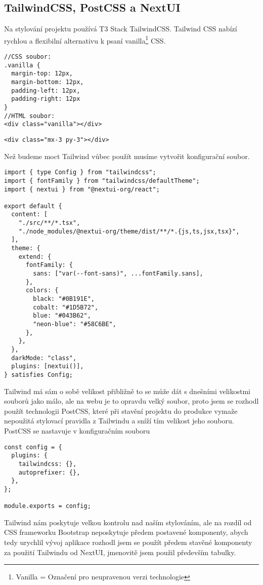 \subsection{TailwindCSS, PostCSS a NextUI}
Na stylování projektu používá T3 Stack TailwindCSS. Tailwind CSS nabízí rychlou a flexibilní alternativu k psaní vanilla\footnote{Vanilla = Označení pro neupravenou verzi technologie} CSS.
\begin{lstlisting}[caption={Ukázka stylování HTML prvku za použití vanilla CSS\cite{tailwind-example}}]
//CSS soubor:
.vanilla {
  margin-top: 12px,
  margin-bottom: 12px,
  padding-left: 12px,
  padding-right: 12px
}
//HTML soubor:
<div class="vanilla"></div>
\end{lstlisting}
\begin{lstlisting}[caption={Ukázka stylování HTML prvku za použití TailwindCSS\cite{tailwind-example}}]
    <div class="mx-3 py-3"></div>
\end{lstlisting}
Než budeme moct Tailwind vůbec použít musíme vytvořit konfigurační soubor\newline{}.

\begin{lstlisting}[caption={Konfigurační soubor TailwindCSS}]
import { type Config } from "tailwindcss";
import { fontFamily } from "tailwindcss/defaultTheme";
import { nextui } from "@nextui-org/react";

export default {
  content: [
    "./src/**/*.tsx",
    "./node_modules/@nextui-org/theme/dist/**/*.{js,ts,jsx,tsx}",
  ],
  theme: {
    extend: {
      fontFamily: {
        sans: ["var(--font-sans)", ...fontFamily.sans],
      },
      colors: {
        black: "#0B191E",
        cobalt: "#1D5B72",
        blue: "#043B62",
        "neon-blue": "#58C6BE",
      },
    },
  },
  darkMode: "class",
  plugins: [nextui()],
} satisfies Config;

\end{lstlisting}
Tailwind má sám o sobě velikost přibližně  to se může dát s dnešními velikostmi souborů jako málo, ale na webu je to opravdu velký soubor, proto jsem se rozhodl použít technologii PostCSS, které při stavění projektu do produkce vymaže nepoužitá stylovací pravidla z Tailwindu a sníží tím velikost jeho souboru. PostCSS se nastavuje v konfiguračním souboru 

\begin{lstlisting}[caption={Konfigurační soubor PostCSS}]
    const config = {
  plugins: {
    tailwindcss: {},
    autoprefixer: {},
  },
};

module.exports = config;
\end{lstlisting}
Tailwind nám poskytuje velkou kontrolu nad naším stylováním, ale na rozdíl od CSS frameworku Bootstrap neposkytuje předem postavené komponenty, abych tedy urychlil vývoj aplikace rozhodl jsem se použít předem stavěné komponenty za použití Tailwindu od NextUI\cite{nextui}, jmenovitě jsem použil především tabulky.

